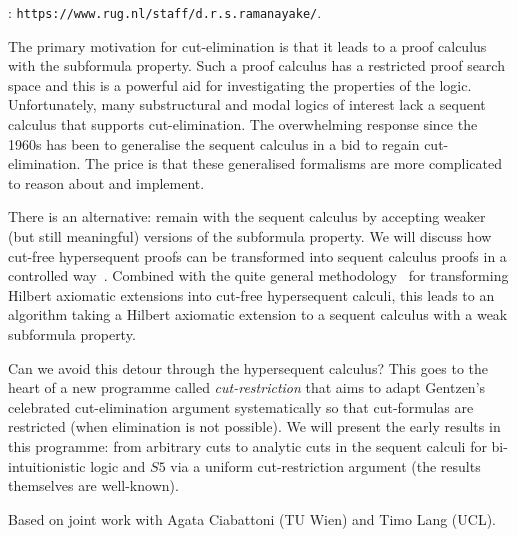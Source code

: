 \documentclass[bsl,meeting]{asl}
\def\urladdr#1{\endgraf\noindent{\it URL Address}: {\tt #1}.}
\newcommand{\NP}{}
\begin{document}
\thispagestyle{empty}


\NP%
\urladdr{https://www.rug.nl/staff/d.r.s.ramanayake/}



The primary motivation for cut-elimination is that it leads to a proof calculus with the subformula property. Such a proof calculus has a restricted proof search space and this is a powerful aid for investigating the properties of the logic. Unfortunately, many substructural and modal logics of interest lack a sequent calculus that supports cut-elimination. The overwhelming response since the 1960s has been to generalise the sequent calculus in a bid to regain cut-elimination. The price is that these generalised formalisms are more complicated to reason about and implement.

There is an alternative: remain with the sequent calculus by accepting weaker (but still meaningful) versions of the subformula property. We will discuss how cut-free hypersequent proofs can be transformed into sequent calculus proofs in a controlled way~\cite{CiaLanRam21}. Combined with the quite general methodology~\cite{CiaGalTer08} for transforming Hilbert axiomatic extensions into cut-free hypersequent calculi, this leads to an algorithm taking a Hilbert axiomatic extension to a sequent calculus with a weak subformula property. 

Can we avoid this detour through the hypersequent calculus? This goes to the heart of a new programme called \textit{cut-restriction} that aims to adapt Gentzen’s celebrated cut-elimination argument systematically so that cut-formulas are restricted (when elimination is not possible). We will present the early results in this programme: from arbitrary cuts  to analytic cuts in the sequent calculi for bi-intuitionistic logic and $S5$ via a uniform cut-restriction argument (the results themselves are well-known).

Based on joint work with Agata Ciabattoni (TU Wien) and Timo Lang (UCL).
\end{document}

